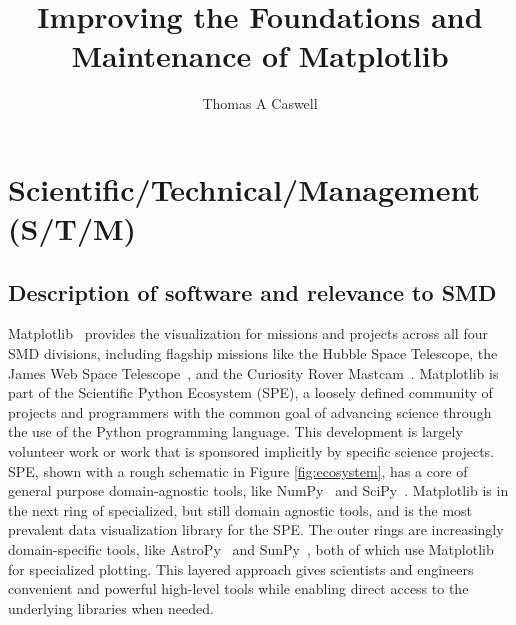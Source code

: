 \documentclass[12pt]{article}
\numberwithin{page}{section}
\begin{document}
\title{Improving the Foundations and Maintenance of Matplotlib}
\author{Thomas A Caswell}
\date{}
\maketitle

\setcounter{tocdepth}{2}
\tableofcontents
\thispagestyle{empty}
\newpage

\section{Scientific/Technical/Management (S/T/M)}
\setcounter{page}{1}

\subsection{Description of software and relevance to SMD}

Matplotlib~\cite{Hunter:2007} provides the visualization for missions and
projects across all four SMD divisions,
including
flagship missions like the Hubble Space Telescope, the James Web Space
Telescope~\cite{jwst_pipeline}, and the Curiosity Rover
Mastcam~\cite{https://doi.org/10.1002/2016EA000219}.  Matplotlib is part of the
Scientific
Python Ecosystem (SPE), a loosely defined community of projects and
programmers with the common goal of advancing science through the use
of the Python programming language.  This development is largely
volunteer work or work that is sponsored implicitly by specific
science projects.  SPE, shown with a rough schematic in Figure
\ref{fig:ecosystem}, has a core of general purpose domain-agnostic
tools, like NumPy~\cite{Harris2020} and SciPy~\cite{Virtanen2020}. Matplotlib
is in the next ring of specialized, but still domain agnostic tools, and is the
most prevalent data visualization
library for the SPE.  The outer rings are increasingly domain-specific tools,
like
AstroPy~\cite{robitaille2013astropy} and
SunPy~\cite{sunpy_community2020}, both of which use Matplotlib for specialized
plotting.  This layered approach gives
scientists and engineers convenient and powerful high-level tools
while enabling direct access to the underlying libraries when needed.
\end{document}
